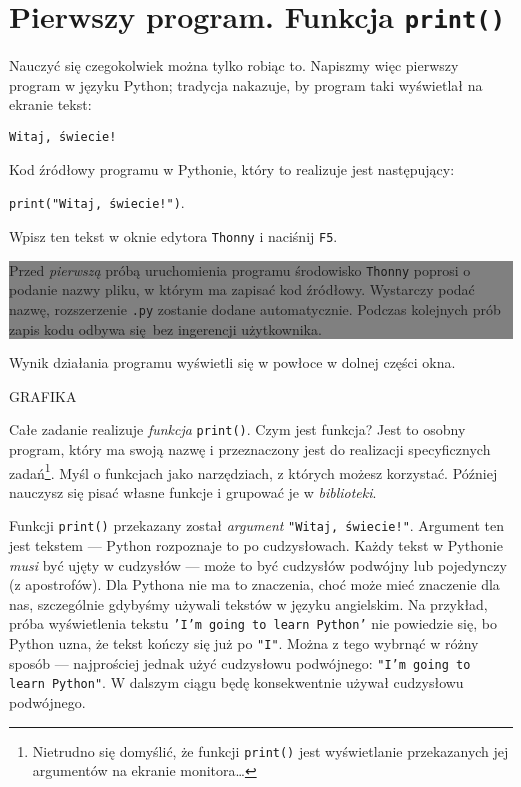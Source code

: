\documentclass[a4paper]{article}
\newcommand{\important}[1]{
    \begin{center}\colorbox{gray}{
        \begin{minipage}[t]{0.9\textwidth}{#1}
        \end{minipage}
    }
    \end{center}
}
\begin{document}
\section{Pierwszy program. Funkcja \texttt{print()}}

Nauczyć się czegokolwiek można tylko robiąc to. Napiszmy więc pierwszy program w języku Python; tradycja nakazuje, by program taki wyświetlał na ekranie tekst:

\texttt{Witaj, świecie!}

Kod źródłowy programu w Pythonie, który to realizuje jest następujący:

\lstinline|print("Witaj, świecie!")|.

Wpisz ten tekst w oknie edytora \texttt{Thonny} i naciśnij \texttt{F5}.

\important{Przed \emph{pierwszą} próbą uruchomienia programu środowisko \texttt{Thonny} poprosi o podanie nazwy pliku, w którym ma zapisać kod źródłowy. Wystarczy podać nazwę, rozszerzenie \texttt{.py} zostanie dodane automatycznie. Podczas kolejnych prób zapis kodu odbywa się bez ingerencji użytkownika.}

Wynik działania programu wyświetli się w powłoce w dolnej części okna.

GRAFIKA



Całe zadanie realizuje \emph{funkcja} \lstinline|print()|. Czym jest funkcja? Jest to osobny program, który ma swoją nazwę i przeznaczony jest do realizacji specyficznych zadań\footnote{Nietrudno się domyślić, że funkcji \lstinline|print()| jest wyświetlanie przekazanych jej argumentów na ekranie monitora\dots}. Myśl o funkcjach jako narzędziach, z których możesz korzystać. Później nauczysz się pisać własne funkcje i grupować je w \emph{biblioteki}.

Funkcji \lstinline|print()| przekazany został \emph{argument} \texttt{"Witaj, świecie!"}. Argument ten jest tekstem --- Python rozpoznaje to po cudzysłowach. Każdy tekst w Pythonie \emph{musi} być ujęty w cudzysłów --- może to być cudzysłów podwójny lub pojedynczy (z apostrofów). Dla Pythona nie ma to znaczenia, choć może mieć znaczenie dla nas, szczególnie gdybyśmy używali tekstów w języku angielskim. Na przykład, próba wyświetlenia tekstu \texttt{'I'm going to learn Python'} nie powiedzie się, bo Python uzna, że tekst kończy się już po \texttt{"I"}. Można z tego wybrnąć w różny sposób --- najprościej jednak użyć cudzysłowu podwójnego: \texttt{"I'm going to learn Python"}. W dalszym ciągu będę konsekwentnie używał cudzysłowu podwójnego.
\end{document}
